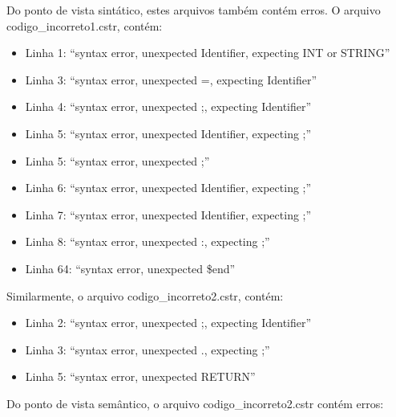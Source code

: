\documentclass[12pt]{article}
\begin{document}
Do ponto de vista sintático, estes arquivos também contém erros. O arquivo codigo\_incorreto1.cstr, contém:

\begin{itemize}
	\item Linha 1: ``syntax error, unexpected Identifier, expecting INT or STRING''
	\item Linha 3: ``syntax error, unexpected =, expecting Identifier''
	\item Linha 4: ``syntax error, unexpected ;, expecting Identifier''
	\item Linha 5: ``syntax error, unexpected Identifier, expecting ;''
	\item Linha 5: ``syntax error, unexpected ;''
	\item Linha 6: ``syntax error, unexpected Identifier, expecting ;''
	\item Linha 7: ``syntax error, unexpected Identifier, expecting ;''
	\item Linha 8: ``syntax error, unexpected :, expecting ;''
	\item Linha 64: ``syntax error, unexpected \$end''\\
\end{itemize}


Similarmente, o arquivo codigo\_incorreto2.cstr, contém:

\begin{itemize}
	\item Linha 2: ``syntax error, unexpected ;, expecting Identifier''
	\item Linha 3: ``syntax error, unexpected ., expecting ;''
	\item Linha 5: ``syntax error, unexpected RETURN''\\
\end{itemize}

Do ponto de vista semântico, o arquivo codigo\_incorreto2.cstr contém erros:
\end{document}
